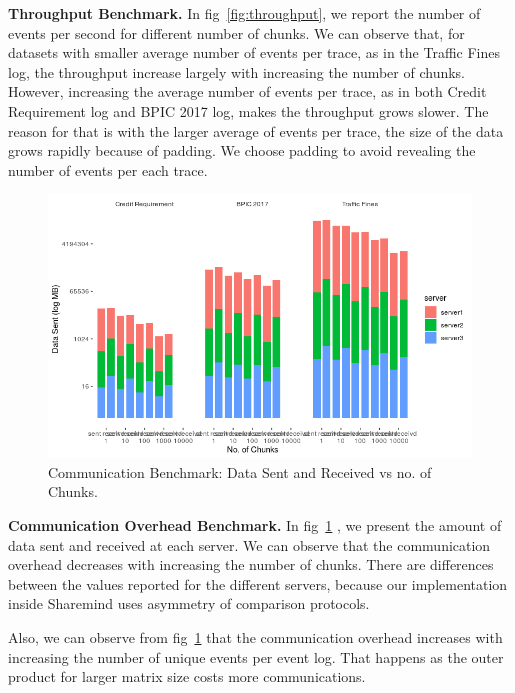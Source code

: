 \textbf{Throughput Benchmark.} In fig~\ref{fig:throughput}, we report the number of events per second for different number of chunks. We can observe that, for datasets with smaller average number of events per trace, as in the Traffic Fines log, the throughput increase largely with increasing the number of chunks. However, increasing the average number of events per trace, as in both Credit Requirement log and BPIC 2017 log, makes the throughput grows slower. The reason for that is with the larger average of events per trace, the size of the data grows rapidly because of padding. We choose padding to avoid revealing the number of events per each trace.


\begin{figure}[!htb]
	\centering
	\includegraphics[width=.95\columnwidth]{figures/communication.png}
	\caption{Communication Benchmark: Data Sent and Received vs no. of Chunks.}
	\label{fig:comm}
\end{figure}

\textbf{Communication Overhead Benchmark.} In fig~\ref{fig:comm} , we present the amount of data sent and received at each server. We can observe that the communication overhead decreases with increasing the number of chunks. There are differences between the values reported for the different servers, because our implementation inside Sharemind uses asymmetry of comparison protocols.

Also, we can observe from fig~\ref{fig:comm} that the communication overhead increases with increasing the number of unique events per event log. That happens as the outer product for larger matrix size costs more communications. 

